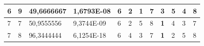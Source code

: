 \documentclass[conference]{IEEEtran}
\begin{document}
\begin{table}[]
\begin{tabular}{|llll|llllllll|}
\multicolumn{1}{|l|}{6}                                                     & \multicolumn{1}{l|}{9}                                                        & \multicolumn{1}{l|}{49,6666667}                                                   & 1,6793E-08                     & \multicolumn{1}{l|}{6}                                                  & \multicolumn{1}{l|}{2}                                                  & \multicolumn{1}{l|}{\textbf{1}}                                         & \multicolumn{1}{l|}{7}                                                  & \multicolumn{1}{l|}{3}                                                  & \multicolumn{1}{l|}{5}                                                  & \multicolumn{1}{l|}{4}                                                  & 8                          \\ \hline
\multicolumn{1}{|l|}{7}                                                     & \multicolumn{1}{l|}{7}                                                        & \multicolumn{1}{l|}{50,9555556}                                                   & 9,3744E-09                     & \multicolumn{1}{l|}{6}                                                  & \multicolumn{1}{l|}{2}                                                  & \multicolumn{1}{l|}{5}                                                  & \multicolumn{1}{l|}{8}                                                  & \multicolumn{1}{l|}{\textbf{1}}                                         & \multicolumn{1}{l|}{4}                                                  & \multicolumn{1}{l|}{3}                                                  & 7                          \\ \hline
\multicolumn{1}{|l|}{7}                                                     & \multicolumn{1}{l|}{8}                                                        & \multicolumn{1}{l|}{96,3444444}                                                   & 6,1254E-18                     & \multicolumn{1}{l|}{6}                                                  & \multicolumn{1}{l|}{4}                                                  & \multicolumn{1}{l|}{3}                                                  & \multicolumn{1}{l|}{7}                                                  & \multicolumn{1}{l|}{\textbf{1}}                                         & \multicolumn{1}{l|}{2}                                                  & \multicolumn{1}{l|}{5}                                                  & 8                          \\ \hline

\end{tabular}
\end{table}
\end{document}
